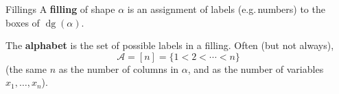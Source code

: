 \documentclass[aspectratio = 1609]{beamer}
\theoremstyle{definition}
\theoremstyle{plain} %
\DeclareMathOperator{\dg}{dg}
\begin{document}
\begin{frame}{Fillings}
    A \textbf{filling} of shape \(\alpha\) is an assignment of labels (e.g.\,numbers) to the boxes of \(\dg(\alpha)\).

    \begin{center}
    \end{center}

  \vspace{2em}

  The \textbf{alphabet} is the set of possible labels in a filling.
  Often (but not always),
  \[\mathcal{A} = [n] = \{1 < 2 < \cdots < n\}\] (the same \(n\) as the number of columns in \(\alpha\), and as the number of variables \(x_1, \dots, x_n\)).
\end{frame}
\end{document}
